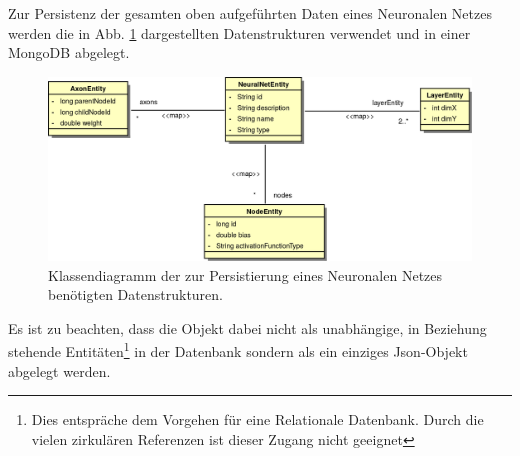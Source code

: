 Zur Persistenz der gesamten oben aufgeführten Daten eines Neuronalen Netzes werden die in Abb. \ref{fig_dbClassdiagram} dargestellten Datenstrukturen verwendet und in einer MongoDB abgelegt. 
\begin{figure}[h]
\begin{center}
\includegraphics[width=\textwidth]{Abbildungen/UML/jan/datenBankKlassendiagramm.png}
\caption{Klassendiagramm der zur Persistierung eines Neuronalen Netzes benötigten Datenstrukturen.}
\label{fig_dbClassdiagram}
\end{center}
\end{figure}
Es ist zu beachten, dass die Objekt dabei nicht als unabhängige, in Beziehung stehende Entitäten\footnote{Dies entspräche dem Vorgehen für eine Relationale Datenbank. Durch die vielen zirkulären Referenzen ist dieser Zugang nicht geeignet} in der Datenbank sondern als ein einziges Json-Objekt abgelegt werden. 
